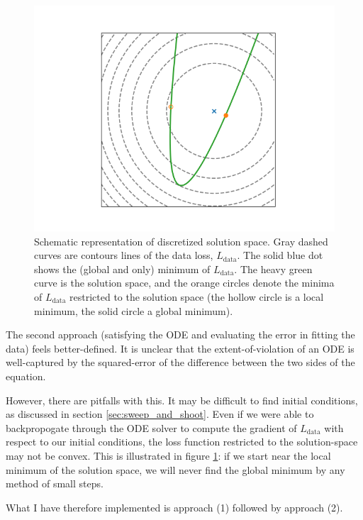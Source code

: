 \documentclass{article}
\begin{document}
\begin{figure}
\includegraphics{images/method/disc_space_viz.png}
\centering
\caption{
Schematic representation of discretized solution space.
Gray dashed curves are contours lines of the data loss, $L_{\mathrm{data}}$.
The solid blue dot shows the (global and only) minimum of $L_{\mathrm{data}}$.
The heavy green curve is the solution space, and the orange circles denote the minima of $L_{\mathrm{data}}$ restricted to the solution space (the hollow circle is a local minimum, the solid circle a global minimum).
}
\label{fig:disc_space_viz}
\end{figure}

The second approach (satisfying the ODE and evaluating the error in fitting the data) feels better-defined.
It is unclear that the extent-of-violation of an ODE is well-captured by the squared-error of the difference between the two sides of the equation.

However, there are pitfalls with this.
It may be difficult to find initial conditions, as discussed in section \ref{sec:sweep_and_shoot}.
Even if we were able to backpropogate through the ODE solver to compute the gradient of $L_{\mathrm{data}}$ with respect to our initial conditions, the loss function restricted to the solution-space may not be convex.
This is illustrated in figure \ref{fig:disc_space_viz}: if we start near the local minimum of the solution space, we will never find the global minimum by any method of small steps.

What I have therefore implemented is approach (1) followed by approach (2).
\end{document}
